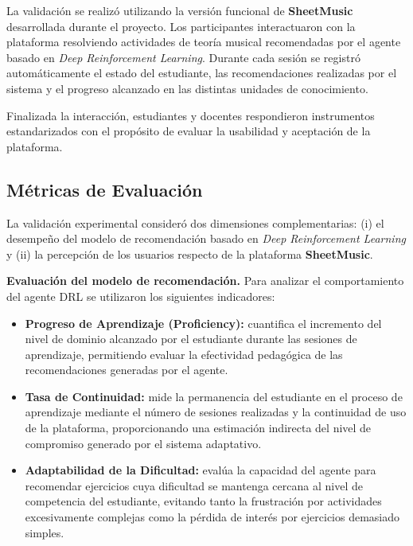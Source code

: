 \documentclass[conference]{IEEEtran}
\begin{document}
La validación se realizó utilizando la versión funcional de \textbf{SheetMusic} desarrollada durante el proyecto. Los participantes interactuaron con la plataforma resolviendo actividades de teoría musical recomendadas por el agente basado en \textit{Deep Reinforcement Learning}. Durante cada sesión se registró automáticamente el estado del estudiante, las recomendaciones realizadas por el sistema y el progreso alcanzado en las distintas unidades de conocimiento.

Finalizada la interacción, estudiantes y docentes respondieron instrumentos estandarizados con el propósito de evaluar la usabilidad y aceptación de la plataforma.

\subsection{Métricas de Evaluación}

La validación experimental consideró dos dimensiones complementarias: (i) el desempeño del modelo de recomendación basado en \textit{Deep Reinforcement Learning} y (ii) la percepción de los usuarios respecto de la plataforma \textbf{SheetMusic}.

\textbf{Evaluación del modelo de recomendación.} Para analizar el comportamiento del agente DRL se utilizaron los siguientes indicadores:

\begin{itemize}

\item \textbf{Progreso de Aprendizaje (Proficiency):} cuantifica el incremento del nivel de dominio alcanzado por el estudiante durante las sesiones de aprendizaje, permitiendo evaluar la efectividad pedagógica de las recomendaciones generadas por el agente.

\item \textbf{Tasa de Continuidad:} mide la permanencia del estudiante en el proceso de aprendizaje mediante el número de sesiones realizadas y la continuidad de uso de la plataforma, proporcionando una estimación indirecta del nivel de compromiso generado por el sistema adaptativo.

\item \textbf{Adaptabilidad de la Dificultad:} evalúa la capacidad del agente para recomendar ejercicios cuya dificultad se mantenga cercana al nivel de competencia del estudiante, evitando tanto la frustración por actividades excesivamente complejas como la pérdida de interés por ejercicios demasiado simples.

\end{itemize}
\end{document}
